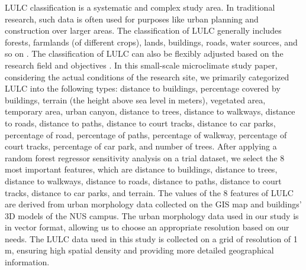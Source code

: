 \documentclass[a4paper,fleqn]{cas-sc}
\begin{document}
LULC classification is a systematic and complex study area. In traditional research, such data is often used for purposes like urban planning and construction over larger areas. The classification of LULC generally includes forests, farmlands (of different crops), lands, buildings, roads, water sources, and so on \citep{hutt2016best,vivekananda2021multi}. The classification of LULC can also be flexibly adjusted based on the research field and objectives \citep{gaur2023comprehensive}. In this small-scale microclimate study paper, considering the actual conditions of the research site, we primarily categorized LULC into the following types: distance to buildings, percentage covered by buildings, terrain (the height above sea level in meters), vegetated area, temporary area, urban canyon, distance to trees, distance to walkways, distance to roads, distance to paths, distance to court tracks, distance to car parks, percentage of road, percentage of paths, percentage of walkway, percentage of court tracks, percentage of car park, and number of trees. After applying a random forest regressor sensitivity analysis on a trial dataset, we select the 8 most important features, which are distance to buildings, distance to trees, distance to walkways, distance to roads, distance to paths, distance to court tracks, distance to car parks, and terrain. The values of the 8 features of LULC are derived from urban morphology data collected on the GIS map and buildings' 3D models of the NUS campus. The urban morphology data used in our study is in vector format, allowing us to choose an appropriate resolution based on our needs. The LULC data used in this study is collected on a grid of resolution of 1 m, ensuring high spatial density and providing more detailed geographical information.
\end{document}
